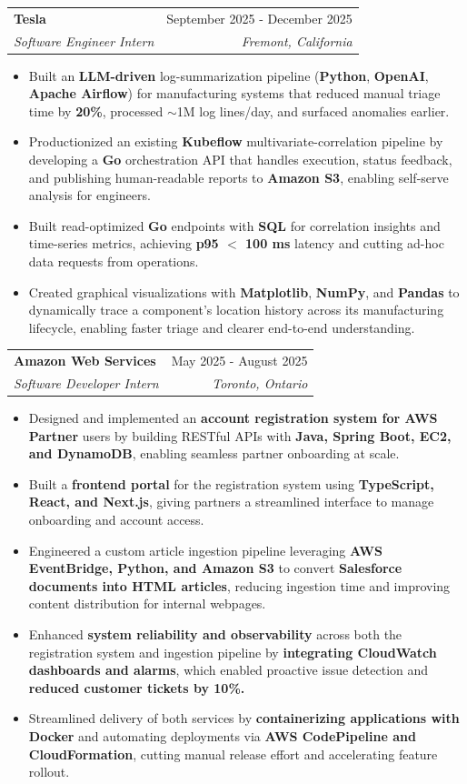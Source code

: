 \documentclass[letterpaper,11pt,usenames,dvipsnames]{article}
\makeatletter
\newcommand{\resumeItem}[1]{
  \item\small{
    {#1 \vspace{-2.41pt}}
  }
}
\newcommand{\resumeSubheading}[4]{
  \vspace{-1.5pt}\item
    \begin{tabular*}{0.97\textwidth}[t]{l@{\extracolsep{\fill}}r}
      \textbf{#1} & #2 \\
      \textit{\small#3} & \textit{\small #4 } \\
    \end{tabular*}\vspace{-7pt}
}
\newcommand{\resumeItemListStart}{\begin{itemize}[leftmargin=0.15in]}
\newcommand{\resumeItemListEnd}{\end{itemize}\vspace{-7pt}}
\makeatother
\begin{document}
    \resumeSubheading
      {Tesla}{September 2025 - December 2025}
      {Software Engineer Intern}{Fremont, California}
      \resumeItemListStart
        \resumeItem{Built an \textbf{LLM-driven} log-summarization pipeline (\textbf{Python}, \textbf{OpenAI}, \textbf{Apache Airflow}) for manufacturing systems that reduced manual triage time by \textbf{20\%}, processed $\sim$1M log lines/day, and surfaced anomalies earlier.}
        \resumeItem{Productionized an existing \textbf{Kubeflow} multivariate-correlation pipeline by developing a \textbf{Go} orchestration API that handles execution, status feedback, and publishing human-readable reports to \textbf{Amazon S3}, enabling self-serve analysis for engineers.}
        \resumeItem{Built read-optimized \textbf{Go} endpoints with \textbf{SQL} for correlation insights and time-series metrics, achieving \textbf{p95 $<$ 100 ms} latency and cutting ad-hoc data requests from operations.}
        \resumeItem{Created graphical visualizations with \textbf{Matplotlib}, \textbf{NumPy}, and \textbf{Pandas} to dynamically trace a component's location history across its manufacturing lifecycle, enabling faster triage and clearer end-to-end understanding.}
      \resumeItemListEnd
    

    \resumeSubheading
        {Amazon Web Services}{May 2025 - August 2025}
        {Software Developer Intern}{Toronto, Ontario}
         \resumeItemListStart
            \resumeItem{Designed and implemented an \textbf{account registration system for AWS Partner} users by building RESTful APIs with \textbf{Java, Spring Boot, EC2, and DynamoDB}, enabling seamless partner onboarding at scale.}
            \resumeItem{Built a \textbf{frontend portal} for the registration system using \textbf{TypeScript, React, and Next.js}, giving partners a streamlined interface to manage onboarding and account access.}
            \resumeItem{Engineered a custom article ingestion pipeline leveraging \textbf{AWS EventBridge, Python, and Amazon S3} to convert \textbf{Salesforce documents into HTML articles}, reducing ingestion time and improving content distribution for internal webpages.}
            \resumeItem{Enhanced \textbf{system reliability and observability} across both the registration system and ingestion pipeline by \textbf{integrating CloudWatch dashboards and alarms}, which enabled proactive issue detection and \textbf{reduced customer tickets by 10\%.}}
            \resumeItem{Streamlined delivery of both services by \textbf{containerizing applications with Docker} and automating deployments via \textbf{AWS CodePipeline and CloudFormation}, cutting manual release effort and accelerating feature rollout.}
        \resumeItemListEnd
  
\end{document}
